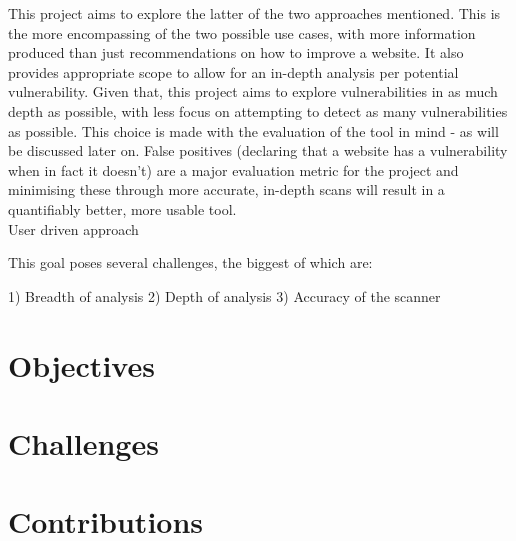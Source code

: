 This project aims to explore the latter of the two approaches mentioned. This is the more encompassing of the two possible use cases, with more information produced than just recommendations on how to improve a website. It also provides appropriate scope to allow for an in-depth analysis per potential vulnerability. Given that, this project aims to explore vulnerabilities in as much depth as possible, with less focus on attempting to detect as many vulnerabilities as possible. This choice is made with the evaluation of the tool in mind - as will be discussed later on. False positives (declaring that a website has a vulnerability when in fact it doesn't) are a major evaluation metric for the project and minimising these through more accurate, in-depth scans will result in a quantifiably better, more usable tool. \\



User driven approach



This goal poses several challenges, the biggest of which are:

1) Breadth of analysis
2) Depth of analysis
3) Accuracy of the scanner




\section{Objectives}
\section{Challenges}
\section{Contributions}